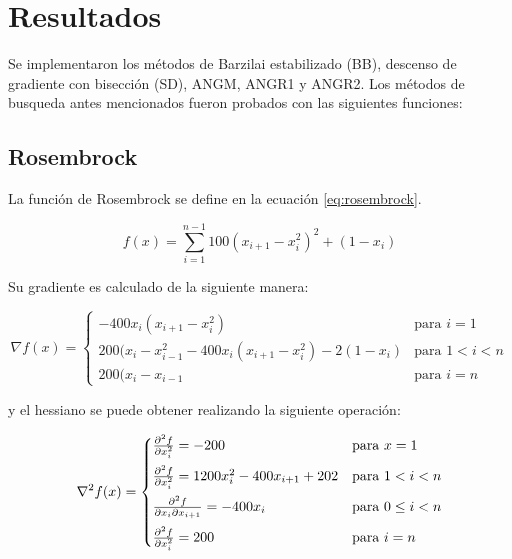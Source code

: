 \section*{Resultados}

Se implementaron los métodos de Barzilai estabilizado (BB), descenso de gradiente con bisección (SD), ANGM, ANGR1 y ANGR2. Los métodos de busqueda antes mencionados fueron probados con las siguientes funciones:

\subsection*{Rosembrock}

La función de Rosembrock se define en la ecuación \ref{eq:rosembrock}.

\begin{equation}
    f(x) = \sum_{i=1}^{n-1}  100(x_{i+1}-x_{i}^2)^2 +(1-x_i)
    \label{eq:rosembrock}
\end{equation}

Su gradiente es calculado de la siguiente manera:

\begin{equation}
    \nabla f (x) =\begin{cases}
        -400x_i(x_{i+1}-x_{i}^2)                              & \text{para } i=1   \\[0.25cm]
        200(x_{i}-x_{i-1}^2-400x_i(x_{i+1}-x_{i}^2) -2(1-x_i) & \text{para } 1<i<n \\[0.25cm]
        200(x_{i}-x_{i-1}                                     & \text{para } i=n
    \end{cases} \label{eq:rosembrock_gradient}
\end{equation}


y el hessiano se puede obtener realizando la siguiente operación:

\begin{equation}
    \nabla^2 f(x)  = \begin{cases}
        \frac{\partial^2 f}{\partial x_i^2} = -200                    & \text{para } x=1         \\[0.25cm]
        \frac{\partial^2 f}{\partial x_i^2} =1200x_i^2-400x_{i+1}+202 & \text{para } 1<i<n       \\[0.25cm]
        \frac{\partial^2 f}{\partial x_i \partial x_{i+1}}  = -400x_i       & \text{para } 0\leq i < n \\[0.25cm]
        \frac{\partial^2 f}{\partial x_i^2} = 200                     & \text{para } i=n
    \end{cases}
    \label{eq:rosembrock_hessian}
\end{equation}

